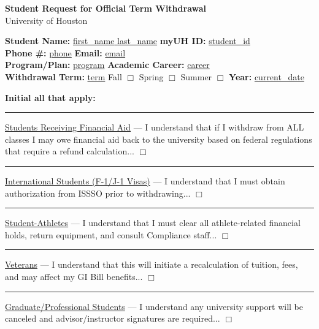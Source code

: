 \documentclass[9pt]{article}
\begin{document}
\begin{center}
    {\Large \textbf{Student Request for Official Term Withdrawal}}\\
    \vspace{0.5em}
    University of Houston
\end{center}

\vspace{1em}

\noindent \textbf{Student Name:} \underline{{{first_name}} {{last_name}}} \hfill \textbf{myUH ID:} \underline{{{student_id}}} \\
\textbf{Phone \#:} \underline{{{phone}}} \hfill \textbf{Email:} \underline{{{email}}} \\
\textbf{Program/Plan:} \underline{{{program}}} \hfill \textbf{Academic Career:} \underline{{{career}}} \\
\textbf{Withdrawal Term:} \underline{{{term}}} \quad Fall $\Box$ \quad Spring $\Box$ \quad Summer $\Box$ \hfill \textbf{Year:} \underline{{{current_date}}}

\vspace{1.5em}
\noindent \textbf{Initial all that apply:}

\vspace{0.5em}

\noindent \rule{1in}{0.4pt} \quad \underline{Students Receiving Financial Aid} — I understand that if I withdraw from ALL classes I may owe financial aid back to the university based on federal regulations that require a refund calculation... $\Box$ \\[0.8em]

\noindent \rule{1in}{0.4pt} \quad \underline{International Students (F-1/J-1 Visas)} — I understand that I must obtain authorization from ISSSO prior to withdrawing... $\Box$ \\[0.8em]

\noindent \rule{1in}{0.4pt} \quad \underline{Student-Athletes} — I understand that I must clear all athlete-related financial holds, return equipment, and consult Compliance staff... $\Box$ \\[0.8em]

\noindent \rule{1in}{0.4pt} \quad \underline{Veterans} — I understand that this will initiate a recalculation of tuition, fees, and may affect my GI Bill benefits... $\Box$ \\[0.8em]

\noindent \rule{1in}{0.4pt} \quad \underline{Graduate/Professional Students} — I understand any university support will be canceled and advisor/instructor signatures are required... $\Box$ \\[0.8em]
\end{document}
